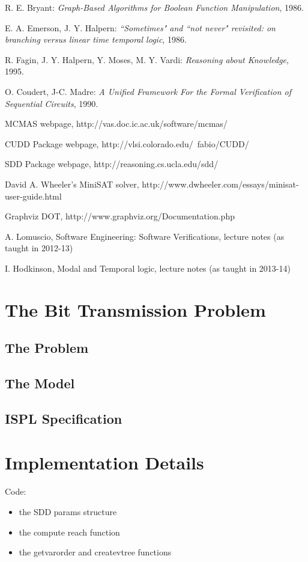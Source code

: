 \documentclass[11pt]{article}
\begin{document}
\begin{thebibliography}{9}
 R. E. Bryant: \textit{Graph-Based Algorithms
for Boolean Function Manipulation}, 1986.

  	E. A. Emerson, J. Y. Halpern:\textit{
``Sometimes" and ``not never" revisited: on branching versus linear time temporal logic}, 1986.
	
R. Fagin, J. Y. Halpern, Y. Moses, M. Y. Vardi: \textit{Reasoning about Knowledge}, 1995.

 O. Coudert, J-C. Madre: \textit{A Unified Framework For the Formal Verification of Sequential Circuits}, 1990.

 MCMAS webpage, http://vas.doc.ic.ac.uk/software/mcmas/

 CUDD Package webpage, http://vlsi.colorado.edu/~fabio/CUDD/

 SDD Package webpage, http://reasoning.cs.ucla.edu/sdd/

 David A. Wheeler's MiniSAT solver,  http://www.dwheeler.com/essays/minisat-user-guide.html

Graphviz DOT, http://www.graphviz.org/Documentation.php

 A. Lomuscio, Software Engineering: Software Verifications, lecture notes (as taught in 2012-13)

 I. Hodkinson, Modal and Temporal logic, lecture notes (as taught in 2013-14)

\end{thebibliography}

\appendix

\section{The Bit Transmission Problem}

\subsection{The Problem}

\subsection{The Model}

\subsection{ISPL Specification}

\section{Implementation Details}

Code:
\begin{itemize}
\item the SDD params structure
\item the compute reach function
\item the getvarorder and createvtree functions
\end{itemize}
\end{document}
